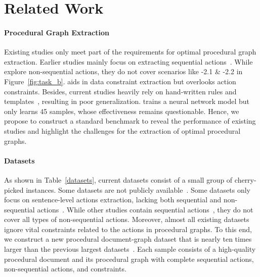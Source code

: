 


\section{Related Work
}

\paragraph{Procedural Graph Extraction}

Existing studies only meet part of the requirements for optimal procedural graph extraction.
Earlier studies mainly focus on extracting sequential actions~\cite{pal2021constructing, lopez2021declarative, ren2023constructing}.
While \citet{epure2015automatic, honkisz2018concept, bellan2023pet} explore non-sequential actions, they do not cover scenarios like \uppercase\expandafter{}-2.1 \& \uppercase\expandafter{}-2.2 in Figure~\ref{fig:task_b}. \citet{friedrich2011process} aids in data constraint extraction but overlooks action constraints.
Besides, current studies heavily rely on hand-written rules and templates~\cite{epure2015automatic, honkisz2018concept}, resulting in poor generalization. \citet{bellan2023pet} trains a neural network model but only learns 45 samples, whose effectiveness remains questionable.
Hence, we propose to construct a standard benchmark to reveal the performance of existing studies and highlight the challenges for the extraction of optimal procedural graphs.

\paragraph{Datasets}

As shown in Table~\ref{datasets}, current datasets consist of a small group of cherry-picked instances.
Some datasets are not publicly available~\cite{epure2015automatic, ferreira2017semi}.
Some datasets only focus on sentence-level actions extraction, lacking both sequential and non-sequential actions~\cite{quishpi2020extracting, qian2020approach, ackermann2021data}. While other studies contain sequential actions~\citet{friedrich2011process, mendling2019natural, lopez2021declarative, bellan2023pet, liang2023knowing, ren2023constructing}, they do not cover all types of non-sequential actions. Moreover, almost all existing datasets ignore vital constraints related to the actions in procedural graphs. To this end, we construct a new procedural document-graph dataset that is nearly ten times larger than the previous largest datasets~\cite{ackermann2021data,qian2020approach}. Each sample consists of a high-quality procedural document and its procedural graph with complete sequential actions, non-sequential actions, and constraints.

